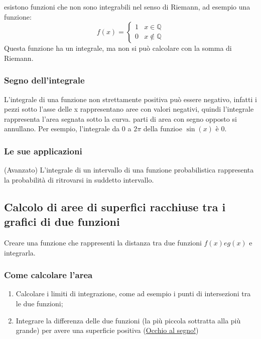 \documentclass{article}
\begin{document}
{} esistono funzioni che non sono integrabili nel senso di
Riemann, ad esempio una funzione:
\[
    f(x)=
    \begin{cases}
    1 & x \in \mathbb{Q} \\
    0 & x \notin \mathbb{Q}
    \end{cases}
\]
Questa funzione ha un integrale, ma non si può calcolare con la somma di Riemann.

\subsubsection{Segno dell'integrale}
L'integrale di una funzione non strettamente positiva può essere negativo, infatti i pezzi
sotto l'asse delle x rappresentano aree con valori negativi, quindi l'integrale rappresenta
l'area segnata sotto la curva. parti di area con segno opposto si annullano.
Per esempio, l'integrale da 0 a \(2\pi\) della funzioe \(\sin(x)\) è 0.

\subsubsection{Le sue applicazioni}

(Avanzato) L'integrale di un intervallo di una funzione probabilistica rappresenta la probabilità di
ritrovarsi in suddetto intervallo.

\newpage
\subsection{Calcolo di aree di superfici racchiuse tra i grafici di due funzioni}
Creare una funzione che rappresenti la distanza tra due funzioni \(f(x) e g(x)\) e integrarla.

\subsubsection{Come calcolare l'area}
\begin{enumerate}
    \item Calcolare i limiti di integrazione, come ad esempio i punti di intersezioni tra le
        due funzioni;
    \item Integrare la differenza delle due funzioni (la più piccola sottratta alla più grande)
        per avere una superficie positiva ({\color{red}\underline{Occhio al segno!}})
\end{enumerate}\phantom{}
\end{document}

